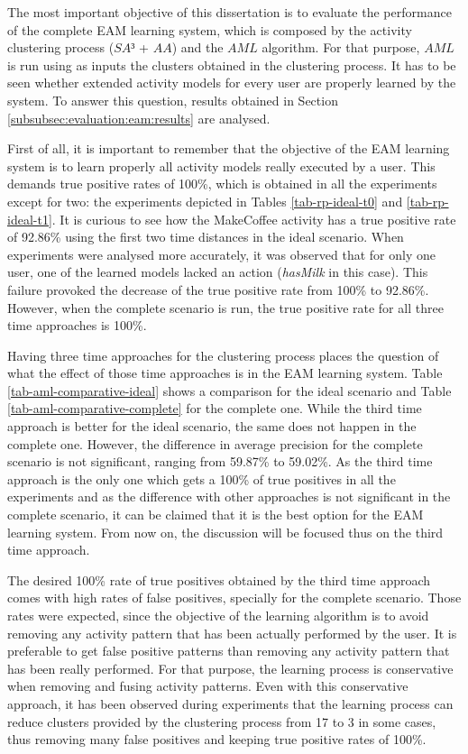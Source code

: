 The most important objective of this dissertation is to evaluate the performance of the complete EAM learning system, which is composed by the activity clustering process ($SA³$ + $AA$) and the $AML$ algorithm. For that purpose, $AML$ is run using as inputs the clusters obtained in the clustering process. It has to be seen whether extended activity models for every user are properly learned by the system. To answer this question, results obtained in Section \ref{subsubsec:evaluation:eam:results} are analysed.

First of all, it is important to remember that the objective of the EAM learning system is to learn properly all activity models really executed by a user. This demands true positive rates of 100\%, which is obtained in all the experiments except for two: the experiments depicted in Tables \ref{tab-rp-ideal-t0} and \ref{tab-rp-ideal-t1}. It is curious to see how the MakeCoffee activity has a true positive rate of 92.86\% using the first two time distances in the ideal scenario. When experiments were analysed more accurately, it was observed that for only one user, one of the learned models lacked an action (\textit{hasMilk} in this case). This failure provoked the decrease of the true positive rate from 100\% to 92.86\%. However, when the complete scenario is run, the true positive rate for all three time approaches is 100\%. 

Having three time approaches for the clustering process places the question of what the effect of those time approaches is in the EAM learning system. Table \ref{tab-aml-comparative-ideal} shows a comparison for the ideal scenario and Table \ref{tab-aml-comparative-complete} for the complete one. While the third time approach is better for the ideal scenario, the same does not happen in the complete one. However, the difference in average precision for the complete scenario is not significant, ranging from 59.87\% to 59.02\%. As the third time approach is the only one which gets a 100\% of true positives in all the experiments and as the difference with other approaches is not significant in the complete scenario, it can be claimed that it is the best option for the EAM learning system. From now on, the discussion will be focused thus on the third time approach.

The desired 100\% rate of true positives obtained by the third time approach comes with high rates of false positives, specially for the complete scenario. Those rates were expected, since the objective of the learning algorithm is to avoid removing any activity pattern that has been actually performed by the user. It is preferable to get false positive patterns than removing any activity pattern that has been really performed. For that purpose, the learning process is conservative when removing and fusing activity patterns. Even with this conservative approach, it has been observed during experiments that the learning process can reduce clusters provided by the clustering process from 17 to 3 in some cases, thus removing many false positives and keeping true positive rates of 100\%. 

